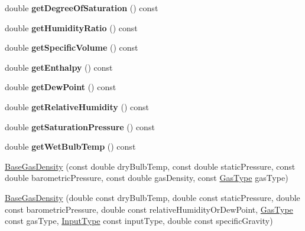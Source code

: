 \begin{DoxyCompactItemize}
double {\bfseries get\+Degree\+Of\+Saturation} () const
\item 
\mbox{\label{class_base_gas_density_a5b7afba9ca1aaf9ef5df56fea9f901bd}} 
double {\bfseries get\+Humidity\+Ratio} () const
\item 
\mbox{\label{class_base_gas_density_af641ae2a0142ac83a21224108a087c50}} 
double {\bfseries get\+Specific\+Volume} () const
\item 
\mbox{\label{class_base_gas_density_a0180adfa955225f6044cb4c7145b9919}} 
double {\bfseries get\+Enthalpy} () const
\item 
\mbox{\label{class_base_gas_density_afd2e1ee6bd8d830be9fc0342709d7a37}} 
double {\bfseries get\+Dew\+Point} () const
\item 
\mbox{\label{class_base_gas_density_a2975d7c69747df8fde8a84fca540a435}} 
double {\bfseries get\+Relative\+Humidity} () const
\item 
\mbox{\label{class_base_gas_density_a2c85831959bdb0b5e6eab370e9408678}} 
double {\bfseries get\+Saturation\+Pressure} () const
\item 
\mbox{\label{class_base_gas_density_a1089d2316a305d825309ed39f3af7454}} 
double {\bfseries get\+Wet\+Bulb\+Temp} () const
\item 
\hyperlink{class_base_gas_density_a84089ddd9d29649d83a7b150b711b989}{Base\+Gas\+Density} (const double dry\+Bulb\+Temp, const double static\+Pressure, const double barometric\+Pressure, const double gas\+Density, const \hyperlink{class_base_gas_density_afb215e48f6193462521b7e8d47306ed3}{Gas\+Type} gas\+Type)
\item 
\hyperlink{class_base_gas_density_a0d53c40eecc4aad87c8fef1cfed1b614}{Base\+Gas\+Density} (double const dry\+Bulb\+Temp, double const static\+Pressure, double const barometric\+Pressure, double const relative\+Humidity\+Or\+Dew\+Point, \hyperlink{class_base_gas_density_afb215e48f6193462521b7e8d47306ed3}{Gas\+Type} const gas\+Type, \hyperlink{class_base_gas_density_a54f846cc4683a49d3904a40fe2986772}{Input\+Type} const input\+Type, double const specific\+Gravity)
\item 

\end{DoxyCompactItemize}
